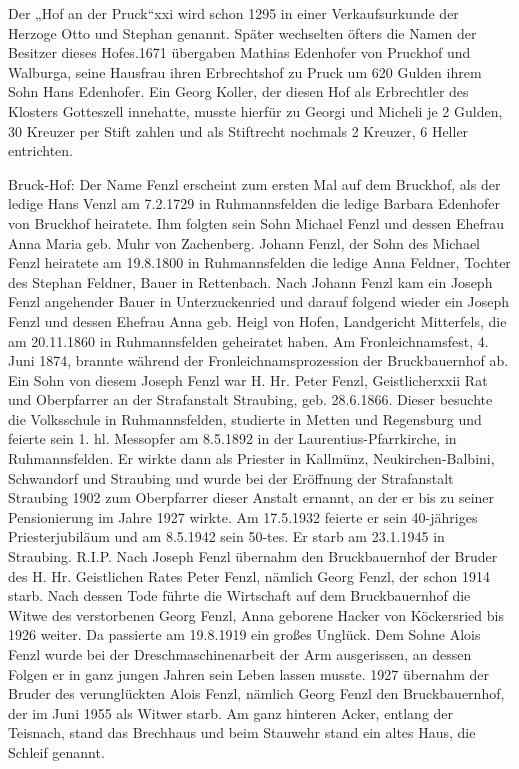 \documentclass{book}
\begin{document}
Der „Hof an der Pruck“xxi wird schon 1295 in einer Verkaufsurkunde der Herzoge
Otto und Stephan genannt. Später wechselten öfters die Namen der Besitzer dieses
Hofes.1671 übergaben Mathias Edenhofer von Pruckhof und Walburga, seine Hausfrau
ihren Erbrechtshof zu Pruck um 620 Gulden ihrem Sohn Hans Edenhofer. Ein Georg
Koller, der diesen Hof als Erbrechtler des Klosters Gotteszell innehatte, musste
hierfür zu Georgi und Micheli je 2 Gulden, 30 Kreuzer per Stift zahlen und als
Stiftrecht nochmals 2 Kreuzer, 6 Heller entrichten.

Bruck-Hof: Der Name Fenzl erscheint zum ersten Mal auf dem Bruckhof, als der
ledige Hans Venzl am 7.2.1729 in Ruhmannsfelden die ledige Barbara Edenhofer von
Bruckhof heiratete. Ihm folgten sein Sohn Michael Fenzl und dessen Ehefrau Anna
Maria geb. Muhr von Zachenberg. Johann Fenzl, der Sohn des Michael Fenzl
heiratete am 19.8.1800 in Ruhmannsfelden die ledige Anna Feldner, Tochter des
Stephan Feldner, Bauer in Rettenbach. Nach Johann Fenzl kam ein Joseph Fenzl
angehender Bauer in Unterzuckenried und darauf folgend wieder ein Joseph Fenzl
und dessen Ehefrau Anna geb. Heigl von Hofen, Landgericht Mitterfels, die am
20.11.1860 in Ruhmannsfelden geheiratet haben. Am Fronleichnamsfest, 4. Juni
1874, brannte während der Fronleichnamsprozession der Bruckbauernhof ab. Ein
Sohn von diesem Joseph Fenzl war H. Hr. Peter Fenzl, Geistlicherxxii Rat und
Oberpfarrer an der Strafanstalt Straubing, geb. 28.6.1866. Dieser besuchte die
Volksschule in Ruhmannsfelden, studierte in Metten und Regensburg und feierte
sein 1. hl. Messopfer am 8.5.1892 in der Laurentius-Pfarrkirche, in
Ruhmannsfelden. Er wirkte dann als Priester in Kallmünz, Neukirchen-Balbini,
Schwandorf und Straubing und wurde bei der Eröffnung der Strafanstalt Straubing
1902 zum Oberpfarrer dieser Anstalt ernannt, an der er bis zu seiner
Pensionierung im Jahre 1927 wirkte. Am 17.5.1932 feierte er sein 40-jähriges
Priesterjubiläum und am 8.5.1942 sein 50-tes. Er starb am 23.1.1945 in
Straubing. R.I.P. Nach Joseph Fenzl übernahm den Bruckbauernhof der Bruder des
H. Hr. Geistlichen Rates Peter Fenzl, nämlich Georg Fenzl, der schon 1914 starb.
Nach dessen Tode führte die Wirtschaft auf dem Bruckbauernhof die Witwe des
verstorbenen Georg Fenzl, Anna geborene Hacker von Köckersried bis 1926 weiter.
Da passierte am 19.8.1919 ein großes Unglück. Dem Sohne Alois Fenzl wurde bei
der Dreschmaschinenarbeit der Arm ausgerissen, an dessen Folgen er in ganz
jungen Jahren sein Leben lassen musste. 1927 übernahm der Bruder des
verunglückten Alois Fenzl, nämlich Georg Fenzl den Bruckbauernhof, der im Juni
1955 als Witwer starb. Am ganz hinteren Acker, entlang der Teisnach, stand das
Brechhaus und beim Stauwehr stand ein altes Haus, die Schleif genannt.
\end{document}
